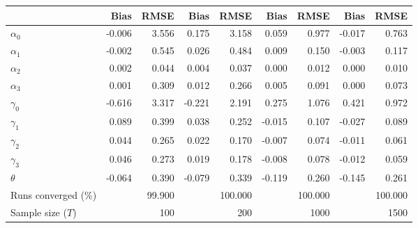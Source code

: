 
\begin{tabular}[t]{lrrrrrrrr}
\toprule
  & Bias & RMSE & Bias & RMSE & Bias & RMSE & Bias & RMSE\\
\midrule
$\alpha_{0}$ & -0.006 & 3.556 & 0.175 & 3.158 & 0.059 & 0.977 & -0.017 & 0.763\\
$\alpha_{1}$ & -0.002 & 0.545 & 0.026 & 0.484 & 0.009 & 0.150 & -0.003 & 0.117\\
$\alpha_{2}$ & 0.002 & 0.044 & 0.004 & 0.037 & 0.000 & 0.012 & 0.000 & 0.010\\
$\alpha_{3}$ & 0.001 & 0.309 & 0.012 & 0.266 & 0.005 & 0.091 & 0.000 & 0.073\\
$\gamma_{0}$ & -0.616 & 3.317 & -0.221 & 2.191 & 0.275 & 1.076 & 0.421 & 0.972\\
$\gamma_{1}$ & 0.089 & 0.399 & 0.038 & 0.252 & -0.015 & 0.107 & -0.027 & 0.089\\
$\gamma_{2}$ & 0.044 & 0.265 & 0.022 & 0.170 & -0.007 & 0.074 & -0.011 & 0.061\\
$\gamma_{3}$ & 0.046 & 0.273 & 0.019 & 0.178 & -0.008 & 0.078 & -0.012 & 0.059\\
$\theta$ & -0.064 & 0.390 & -0.079 & 0.339 & -0.119 & 0.260 & -0.145 & 0.261\\
Runs converged (\%) &  & 99.900 &  & 100.000 &  & 100.000 &  & 100.000\\
Sample size ($T$) &  & 100 &  & 200 &  & 1000 &  & 1500\\
\bottomrule
\end{tabular}
